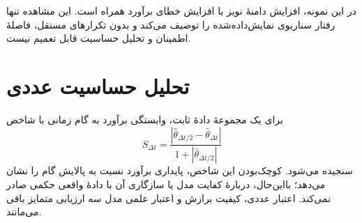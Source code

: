 در این نمونه، افزایش دامنهٔ نویز با افزایش خطای برآورد همراه است. این مشاهده تنها رفتار سناریوی نمایش‌داده‌شده را توصیف می‌کند و بدون تکرارهای مستقل، فاصلهٔ اطمینان و تحلیل حساسیت قابل تعمیم نیست.

\section{تحلیل حساسیت عددی}

برای یک مجموعهٔ دادهٔ ثابت، وابستگی برآورد به گام زمانی با شاخص
\begin{equation}
  S_{\Delta t}=
  \frac{\left\lvert
  \widehat{\theta}_{\Delta t/2}-\widehat{\theta}_{\Delta t}
  \right\rvert}
  {1+\left\lvert\widehat{\theta}_{\Delta t/2}\right\rvert}
  \label{eq:step-sensitivity}
\end{equation}
سنجیده می‌شود. کوچک‌بودن این شاخص، پایداری برآورد نسبت به پالایش گام را نشان می‌دهد؛ بااین‌حال، دربارهٔ کفایت مدل یا سازگاری آن با دادهٔ واقعی حکمی صادر نمی‌کند. اعتبار عددی، کیفیت برازش و اعتبار علمی مدل سه ارزیابی متمایز باقی می‌مانند.
